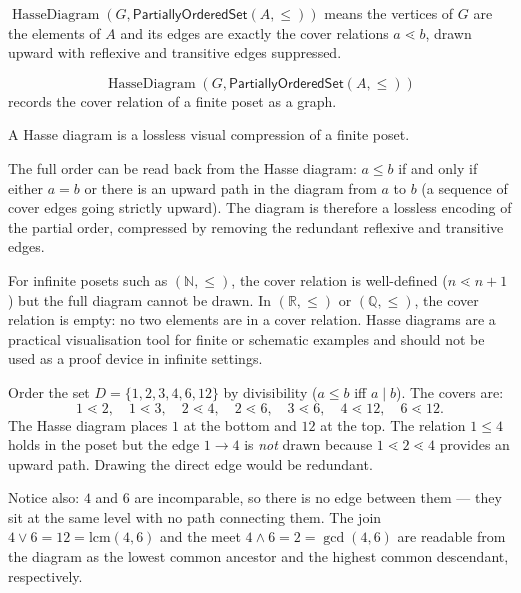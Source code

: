 \begin{remark*}
$\operatorname{HasseDiagram}(G,\mathsf{PartiallyOrderedSet}(A,\leq))$ means
the vertices of $G$ are the elements of $A$ and its edges are exactly the cover
relations $a\lessdot b$, drawn upward with reflexive and transitive edges
suppressed.
\end{remark*}

\begin{remark*}
\[
  \operatorname{HasseDiagram}(G,\mathsf{PartiallyOrderedSet}(A,\leq))
\] records
the cover relation of a finite poset as a graph.
\end{remark*}

\begin{remark*}[Interpretation]
A Hasse diagram is a lossless visual compression of a finite poset.
\end{remark*}

\begin{remark*}[Exposition]
The full order can be read back from the Hasse diagram: $a \leq b$ if and
only if either $a = b$ or there is an upward path in the diagram from $a$ to
$b$ (a sequence of cover edges going strictly upward).  The diagram is therefore
a lossless encoding of the partial order, compressed by removing the redundant
reflexive and transitive edges.
\end{remark*}

\begin{remark*}[Exposition]
For infinite posets such as $(\mathbb{N}, \leq)$, the cover relation is
well-defined ($n \lessdot n+1$) but the full diagram cannot be drawn.  In
$(\mathbb{R}, \leq)$ or $(\mathbb{Q}, \leq)$, the cover relation is empty:
no two elements are in a cover relation.  Hasse diagrams are a practical
visualisation tool for finite or schematic examples and should not be used
as a proof device in infinite settings.
\end{remark*}

\begin{remark*}[Examples]
Order the set $D = \{1, 2, 3, 4, 6, 12\}$ by divisibility ($a \leq b$ iff
$a \mid b$).  The covers are:
\[
  1 \lessdot 2,\quad
  1 \lessdot 3,\quad
  2 \lessdot 4,\quad
  2 \lessdot 6,\quad
  3 \lessdot 6,\quad
  4 \lessdot 12,\quad
  6 \lessdot 12.
\]
The Hasse diagram places $1$ at the bottom and $12$ at the top.  The relation
$1 \leq 4$ holds in the poset but the edge $1 \to 4$ is \emph{not} drawn
because $1 \lessdot 2 \lessdot 4$ provides an upward path.  Drawing the direct
edge would be redundant.

Notice also: $4$ and $6$ are incomparable, so there is no edge between them ---
they sit at the same level with no path connecting them.  The join
$4 \vee 6 = 12 = \mathrm{lcm}(4,6)$ and the meet $4 \wedge 6 = 2 = \gcd(4,6)$
are readable from the diagram as the lowest common ancestor and the highest
common descendant, respectively.
\end{remark*}


